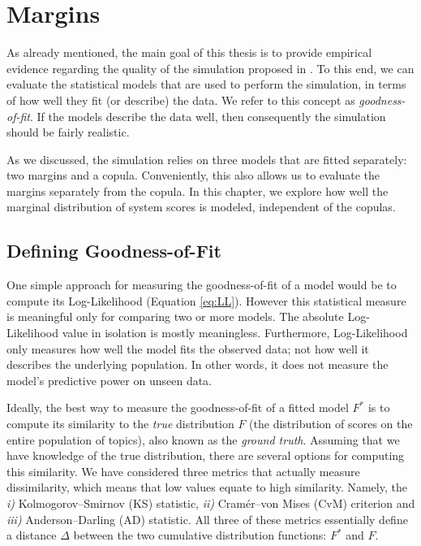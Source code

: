 \chapter{Margins}\label{ch:3}

As already mentioned, the main goal of this thesis is to provide empirical evidence regarding the quality of the simulation proposed in \cite{Urbano2018}. To this end, we can evaluate the statistical models that are used to perform the simulation, in terms of how well they fit (or describe) the data. We refer to this concept as \textit{goodness-of-fit}. If the models describe the data well, then consequently the simulation should be fairly realistic. 

As we discussed, the simulation relies on three models that are fitted separately: two margins and a copula. Conveniently, this also allows us to evaluate the margins separately from the copula. In this chapter, we explore how well the marginal distribution of system scores is modeled, independent of the copulas.

\section{Defining Goodness-of-Fit}

One simple approach for measuring the goodness-of-fit of a model would be to compute its Log-Likelihood (Equation \ref{eq:LL}). However this statistical measure is meaningful only for comparing two or more models. The absolute Log-Likelihood value in isolation is mostly meaningless. Furthermore, Log-Likelihood only measures how well the model fits the observed data; not how well it describes the underlying population. In other words, it does not measure the model's predictive power on unseen data.

Ideally, the best way to measure the goodness-of-fit of a fitted model $F^*$ is to compute its similarity to the \textit{true} distribution $F$ (the distribution of scores on the entire population of topics), also known as the \textit{ground truth}. Assuming that we have knowledge of the true distribution, there are several options for computing this similarity. We have considered three metrics that actually measure dissimilarity, which means that low values equate to high similarity. Namely, the \textit{i)} Kolmogorov–Smirnov (KS) statistic, \textit{ii)} Cramér–von Mises (CvM) criterion and \textit{iii)} Anderson–Darling (AD) statistic. All three of these metrics essentially define a distance $\Delta$ between the two cumulative distribution functions: $F^*$ and $F$.

